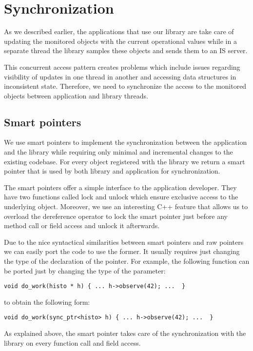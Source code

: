 \chapter{Synchronization} %
\label{Capitolul5}


As we described earlier, the applications that use our library are take care of updating the monitored objects with the current operational values while in a separate thread the library samples these objects and sends them to an IS server. 

This concurrent access pattern creates problems which include issues regarding visibility of updates in one thread in another and accessing data structures in inconsistent state. Therefore, we need to synchronize the access to the monitored objects between application and library 
threads.

\section*{Smart pointers}

We use smart pointers to implement the synchronization between the application and the library while requiring only minimal and incremental changes to the existing codebase. For every object registered with the library we return a smart pointer that is used by both library and application for synchronization. 

The smart pointers offer a simple interface to the application developer. They have two functions called lock and unlock which ensure exclusive access to the underlying object. Moreover, we use an interesting C++ feature \citep{andrei2001modern} that allows us to overload the dereference operator to lock the smart pointer just before any method call or field access and unlock it afterwards.

Due to the nice syntactical similarities between smart pointers and raw pointers we can easily port the code to use the former. It usually requires just changing the type of the declaration of the pointer. For example, the following function can be ported just by changing the type of the parameter:

\verb+void do_work(histo * h) { ... h->observe(42); ...  }+

to obtain the following form:

\verb+void do_work(sync_ptr<histo> h) { ... h->observe(42); ...  }+

As explained above, the smart pointer takes care of the synchronization with the library on every function call and field access.

